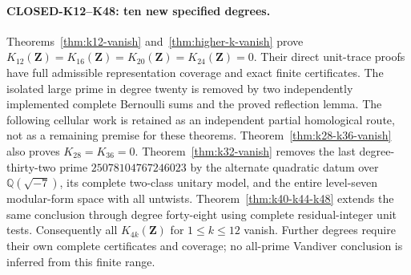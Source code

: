 \documentclass[11pt,a4paper]{article}
\theoremstyle{definition}
\begin{document}
\paragraph{CLOSED-K12--K48: ten new specified degrees.}
Theorems~\ref{thm:k12-vanish} and~\ref{thm:higher-k-vanish} prove
$K_{12}(\mathbf Z)=K_{16}(\mathbf Z)=K_{20}(\mathbf Z)=K_{24}(\mathbf Z)=0$.
Their direct unit-trace proofs have full admissible representation
coverage and exact finite certificates. The isolated large prime in
degree twenty is removed by two independently implemented complete
Bernoulli sums and the proved reflection lemma. The following cellular
work is retained as an independent partial homological route, not as a
remaining premise for these theorems. Theorem~\ref{thm:k28-k36-vanish} also proves $K_{28}=K_{36}=0$.
Theorem~\ref{thm:k32-vanish} removes the last degree-thirty-two
prime $25078104767246023$ by the alternate quadratic datum over
$\mathbb Q(\sqrt{-7})$, its complete two-class unitary model,
and the entire level-seven modular-form space with all untwists.
Theorem~\ref{thm:k40-k44-k48} extends the same conclusion
through degree forty-eight using complete residual-integer unit tests.
Consequently all $K_{4k}(\mathbf Z)$ for $1\leq k\leq12$ vanish.
Further degrees require their own complete certificates and coverage;
no all-prime Vandiver conclusion is inferred from this finite range.
\end{document}
